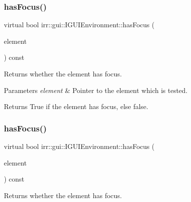 \subsubsection{\texorpdfstring{has\+Focus()}{hasFocus()}\hspace{0.1cm}{\footnotesize\ttfamily [1/2]}}
{\footnotesize\ttfamily virtual bool irr\+::gui\+::\+I\+G\+U\+I\+Environment\+::has\+Focus (\begin{DoxyParamCaption}\item[{\hyperlink{classirr_1_1gui_1_1IGUIElement}{I\+G\+U\+I\+Element} $\ast$}]{element }\end{DoxyParamCaption}) const\hspace{0.3cm}{\ttfamily [pure virtual]}}



Returns whether the element has focus. 


\begin{DoxyParams}{Parameters}
{\em element} & Pointer to the element which is tested. \\
\hline
\end{DoxyParams}
\begin{DoxyReturn}{Returns}
True if the element has focus, else false. 
\end{DoxyReturn}
\mbox{\label{classirr_1_1gui_1_1IGUIEnvironment_a88c483f30a0f35debed70e8e51836552}} 
\subsubsection{\texorpdfstring{has\+Focus()}{hasFocus()}\hspace{0.1cm}{\footnotesize\ttfamily [2/2]}}
{\footnotesize\ttfamily virtual bool irr\+::gui\+::\+I\+G\+U\+I\+Environment\+::has\+Focus (\begin{DoxyParamCaption}\item[{\hyperlink{classirr_1_1gui_1_1IGUIElement}{I\+G\+U\+I\+Element} $\ast$}]{element }\end{DoxyParamCaption}) const\hspace{0.3cm}{\ttfamily [pure virtual]}}



Returns whether the element has focus. 


